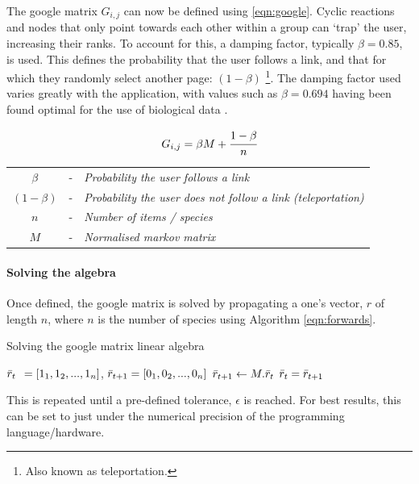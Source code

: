 The google matrix $G_{i,j}$ can now be defined using \autoref{eqn:google}.
 Cyclic reactions and nodes that only point towards each other within a group can `trap' the user, increasing their ranks. 
 To account for this, a damping factor, typically $\beta = 0.85$, is used. This defines the probability that the user follows a link, and that for which they randomly select another page: $(1-\beta)$ \footnote{Also known as teleportation.}. The damping factor used varies greatly with the application, with values such as $\beta = 0.694$ having been found optimal for the use of biological data \citep{biopr}.


\begin{center}
\begin{equation}
     G_{i,j} = \beta M + \cfrac{1 - \beta}{n}
 \label{eqn:google}
\end{equation}
\begin{tabular}{ccl}
$\beta$&-&\textit{Probability the user follows a link} \\
 $(1 - \beta)$&-&\textit{Probability the user does not follow a link (teleportation)} \\
$n$&-&\textit{Number of items / species}\\
$M$&-&\textit{Normalised markov matrix}
\end{tabular}
\end{center}


\paragraph{Solving the algebra}

Once defined, the google matrix is solved by propagating a one's vector, $r$ of length $n$, where $n$ is the number of species using Algorithm \ref{eqn:forwards}.


\begin{algorithm} \caption{Solving the google matrix linear algebra}
\begin{algorithmic}[1]
\State  $\Bar{r}_t \:\:= [1_1, 1_2, ... , 1_n]$, $\Bar{r}_{t+1} = [0_1, 0_2, ... , 0_n]$
\State
{}
\State $\Bar{r}_{t+1} \gets M . \Bar{r}_t$
\State $\Bar{r}_t = \Bar{r}_{t+1}$
\EndWhile
\end{algorithmic}\label{eqn:forwards}
\end{algorithm}


 This is repeated until a pre-defined tolerance, $\epsilon$ is reached. For best results, this can be set to just under the numerical precision of the programming language/hardware. 


